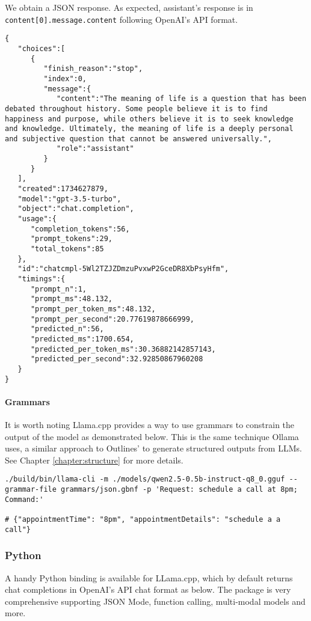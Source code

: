We obtain a JSON response. As expected, assistant's response is in \texttt{content[0].message.content} following OpenAI's API format.

\begin{verbatim}
{
   "choices":[
      {
         "finish_reason":"stop",
         "index":0,
         "message":{
            "content":"The meaning of life is a question that has been debated throughout history. Some people believe it is to find happiness and purpose, while others believe it is to seek knowledge and knowledge. Ultimately, the meaning of life is a deeply personal and subjective question that cannot be answered universally.",
            "role":"assistant"
         }
      }
   ],
   "created":1734627879,
   "model":"gpt-3.5-turbo",
   "object":"chat.completion",
   "usage":{
      "completion_tokens":56,
      "prompt_tokens":29,
      "total_tokens":85
   },
   "id":"chatcmpl-5Wl2TZJZDmzuPvxwP2GceDR8XbPsyHfm",
   "timings":{
      "prompt_n":1,
      "prompt_ms":48.132,
      "prompt_per_token_ms":48.132,
      "prompt_per_second":20.77619878666999,
      "predicted_n":56,
      "predicted_ms":1700.654,
      "predicted_per_token_ms":30.36882142857143,
      "predicted_per_second":32.92850867960208
   }
}
\end{verbatim}

\paragraph{Grammars}

It is worth noting Llama.cpp provides a way to use grammars  to constrain the output of the model as demonstrated below. This is the same technique Ollama uses, a similar approach to Outlines' to generate structured outputs from LLMs. See Chapter \ref{chapter:structure} for more details.

\begin{verbatim}
./build/bin/llama-cli -m ./models/qwen2.5-0.5b-instruct-q8_0.gguf --grammar-file grammars/json.gbnf -p 'Request: schedule a call at 8pm; Command:'

# {"appointmentTime": "8pm", "appointmentDetails": "schedule a a call"}
\end{verbatim}

\subsubsection{Python}

A handy Python binding  is available for LLama.cpp, which by default returns chat completions in OpenAI's API chat format as below. The package is very comprehensive supporting JSON Mode, function calling, multi-modal models and more.

